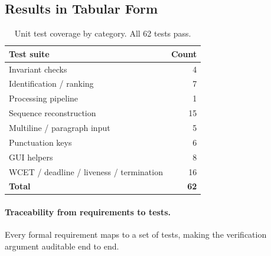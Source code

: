 \documentclass[11pt,a4paper]{article}
\begin{document}
\subsection{Results in Tabular Form}

\begin{table}[H]
    \centering
    \begin{tabular}{@{}lr@{}}
        \toprule
        \textbf{Test suite} & \textbf{Count} \\
        \midrule
        Invariant checks & 4 \\
        Identification / ranking & 7 \\
        Processing pipeline & 1 \\
        Sequence reconstruction & 15 \\
        Multiline / paragraph input & 5 \\
        Punctuation keys & 6 \\
        GUI helpers & 8 \\
        WCET / deadline / liveness / termination & 16 \\
        \midrule
        \textbf{Total} & \textbf{62} \\
        \bottomrule
    \end{tabular}
    \caption{Unit test coverage by category. All 62 tests pass.}
    \label{tab:tests}
\end{table}

\paragraph{Traceability from requirements to tests.}
Every formal requirement maps to a set of tests, making the verification
argument auditable end to end.
\end{document}
